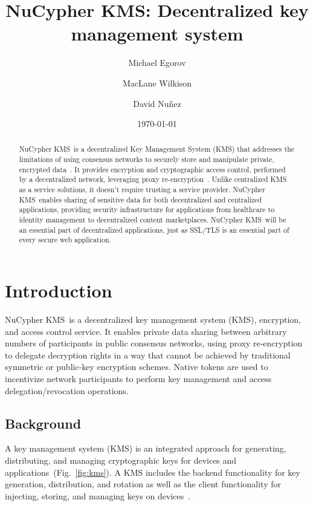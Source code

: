 \documentclass[longbibliography,nofootinbib]{revtex4-1}
\newcommand{\kms}{NuCypher KMS}
\newcommand{\figref}[1]{Fig.~\ref{#1}}
\begin{document}
\title{\kms: Decentralized key management system}

\author{Michael Egorov}
\author{MacLane Wilkison}

\author{David Nu{\~n}ez}

\begin{abstract}
    \kms~is a decentralized Key Management System (KMS) that addresses the limitations of using consensus
    networks to securely store and manipulate private, encrypted data~\cite{cryptoeprint:2017:201}.
    It provides encryption and cryptographic access control, performed by a decentralized network,
    leveraging proxy re-encryption~\cite{wiki:pre}.
    Unlike centralized KMS as a service solutions, it doesn't require trusting a service provider.
    \kms~enables sharing of sensitive data for both decentralized and centralized applications,
    providing security infrastructure for applications from healthcare to identity management to decentralized content marketplaces.
    \kms~will be an essential part of decentralized applications,
    just as SSL/TLS is an essential part of every secure web application.
\end{abstract}

\date{\today}
\maketitle

\tableofcontents

\newpage

\section{Introduction}

\kms~is a decentralized key management system (KMS), encryption, and access control service.
It enables private data sharing between arbitrary numbers of participants in public consensus networks,
using proxy re-encryption to delegate decryption rights in a way that cannot be achieved by traditional symmetric or public-key encryption schemes.
Native tokens are used to incentivize network participants to perform key management and access delegation/revocation operations.

\subsection{Background}
A key management system (KMS) is an integrated approach for generating, distributing, and managing cryptographic keys for devices and
applications~(\figref{fig:kms}).
A KMS includes the backend functionality for key generation, distribution, and rotation as well as the client functionality for
injecting, storing, and managing keys on devices~\cite{wiki:kms}.
\end{document}
